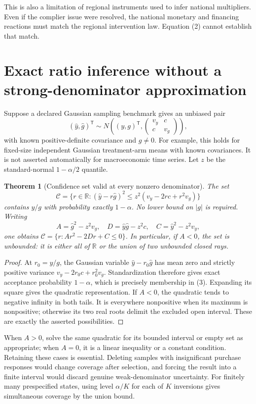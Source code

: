 \documentclass[11pt]{article}
\newtheorem{theorem}{Theorem}
\theoremstyle{definition}
\begin{document}
This is also a limitation of regional instruments used to infer national multipliers. Even if the complier issue were resolved, the national monetary and financing reactions must match the regional intervention law. Equation (2) cannot establish that match.

\section*{Exact ratio inference without a strong-denominator approximation}
Suppose a declared Gaussian sampling benchmark gives an unbiased pair
\[
 (\widehat y,\widehat g)^{\mathsf T}\sim
 N\left((y,g)^{\mathsf T},\begin{pmatrix}v_y&c\\c&v_g\end{pmatrix}\right),
\]
with known positive-definite covariance and $g\ne0$. For example, this holds for fixed-size independent Gaussian treatment-arm means with known covariances. It is not asserted automatically for macroeconomic time series. Let $z$ be the standard-normal $1-\alpha/2$ quantile.

\begin{theorem}[Confidence set valid at every nonzero denominator]
The set
\[
 \mathcal C=\{r\in\mathbb R:(\widehat y-r\widehat g)^2
 \le z^2(v_y-2rc+r^2v_g)\}
 \tag{3}
\]
contains $y/g$ with probability exactly $1-\alpha$. No lower bound on $|g|$ is required. Writing
\[
 A=\widehat g^2-z^2v_g,\quad D=\widehat y\widehat g-z^2c,
 \quad C=\widehat y^2-z^2v_y,
\]
one obtains $\mathcal C=\{r:Ar^2-2Dr+C\le0\}$. In particular, if $A<0$, the set is unbounded: it is either all of $\mathbb R$ or the union of two unbounded closed rays.
\end{theorem}
\begin{proof}
At $r_0=y/g$, the Gaussian variable $\widehat y-r_0\widehat g$ has mean zero and strictly positive variance $v_y-2r_0c+r_0^2v_g$. Standardization therefore gives exact acceptance probability $1-\alpha$, which is precisely membership in (3). Expanding its square gives the quadratic representation. If $A<0$, the quadratic tends to negative infinity in both tails. It is everywhere nonpositive when its maximum is nonpositive; otherwise its two real roots delimit the excluded open interval. These are exactly the asserted possibilities.
\end{proof}
When $A>0$, solve the same quadratic for its bounded interval or empty set as appropriate; when $A=0$, it is a linear inequality or a constant condition. Retaining these cases is essential. Deleting samples with insignificant purchase responses would change coverage after selection, and forcing the result into a finite interval would discard genuine weak-denominator uncertainty. For finitely many prespecified states, using level $\alpha/K$ for each of $K$ inversions gives simultaneous coverage by the union bound.
\end{document}

